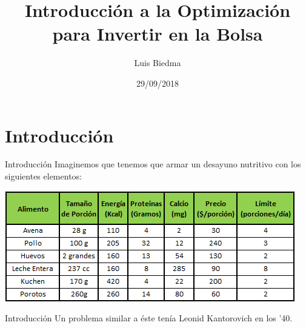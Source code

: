 \documentclass[12pt,aspectratio=169]{beamer}
\title{Introducción a la Optimización para Invertir en la Bolsa}
\author{Luis Biedma}
\date{29/09/2018}
\begin{document}
\maketitle

\section{Introducción}

\begin{frame}{Introducción}
Imaginemos que tenemos que armar un desayuno nutritivo con los siguientes elementos:

\begin{center}
\includegraphics[width=.8\paperwidth]{desayuno.png}
\end{center}
\end{frame}

\begin{frame}{Introducción}
Un problema similar a éste tenía Leonid Kantorovich en los '40.

\begin{center}
\end{center}
\end{frame}
\end{document}
